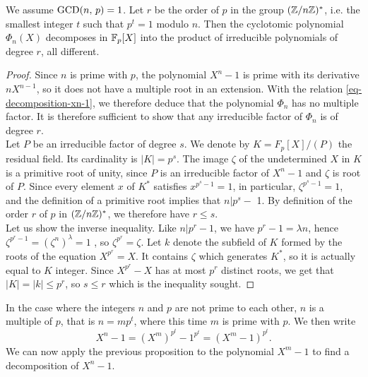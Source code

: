 \begin{prop}[Cyclotomy on $ \FF_p $]
\label{prop-cyclotomy-fp}
We assume $ \operatorname{GCD} (n, \, p) = 1 $. Let $ r $ be the order of $ p $ in the group $ (\mathbb{Z}/n \mathbb{Z})^* $, i.e. the smallest integer $ t $ such that $ p^t = 1 $ modulo $ n $. Then the cyclotomic polynomial $ \Phi_n (X) $ decomposes in $ \mathbb{F}_p [X] $ into the product of irreducible polynomials of degree $ r $, all different.
\end{prop}
\begin{proof}
Since $ n $ is prime with $ p $, the polynomial $ X^n-1 $ is prime with its derivative $ n X^{n-1} $, so it does not have a multiple root in an extension. With the relation \eqref{eq-decomposition-xn-1}, we therefore deduce that the polynomial $ \Phi_n $ has no multiple factor. It is therefore sufficient to show that any irreducible factor of $ \Phi_n $ is of degree $ r $. \\Let $ P $ be an irreducible factor of degree $ s $. We denote by $ K = F_p [X] / (P) $ the residual field. Its cardinality is $ | K | = p^s $. The image $ \zeta $ of the undetermined $ X $ in $ K $ is a primitive root of unity, since $ P $ is an irreducible factor of $ X^n-1 $ and $ \zeta $ is root of $ P $. Since every element $ x $ of $ K^* $ satisfies $ x^{p^s-1} = 1 $, in particular, $ \zeta^{p^s-1} = 1 $, and the definition of a primitive root  implies that $ n | p^s-$ 1. By definition of the order $ r $ of $ p $ in $ (\mathbb{Z}/n \mathbb{Z})^* $, we therefore have $ r \leq s $. \\Let us show the inverse inequality. Like $ n | p^r - 1 $, we have $ p^r - 1 = \lambda n $, hence $ \zeta^{p^r - 1} = (\zeta^n)^{\lambda} = 1 $ , so $ \zeta^{p^r} = \zeta $. Let $ k $ denote the subfield of $ K $ formed by the roots of the equation $ X^{p^r} = X $. It contains $ \zeta $ which generates $ K^* $, so it is actually equal to $ K $ integer. Since $ X^{p^r} - X $ has at most $ p^r $ distinct roots, we get that $ | K | = | k | \leq p^r $, so $ s \leq r $ which is the inequality sought.
\end{proof}
 
 
\begin{rem}
\label{rmk-cyclotomy-cas-special}
In the case where the integers $ n $ and $ p $ are not prime to each other, $ n $ is a multiple of $ p $, that is $ n = mp^t $, where this time $ m $ is prime with $ p $. We then write
\begin{equation*}
X^n - 1 = (X^m)^{p^t} - 1^{p^t} = (X^m - 1)^{p^t}.
\end{equation*}
We can now apply the previous proposition to the polynomial $ X^m - 1 $ to find a decomposition of $ X^n-1 $.
\end{rem}
 
